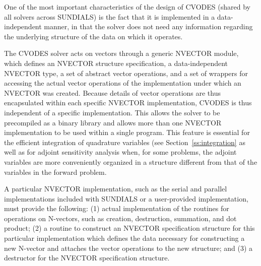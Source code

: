 One of the most important characteristics of the design of CVODES 
(shared by all solvers across SUNDIALS) is the fact that it is implemented 
in a data-independent manner, in that the solver does not need any information
regarding the underlying structure of the data on which it operates.

The CVODES solver acts on vectors through a generic NVECTOR module,
which defines an NVECTOR structure specification, a data-independent NVECTOR type, 
a set of abstract vector operations, and a set of wrappers for accessing the actual vector
operations of the implementation under which an NVECTOR was created. Because
details of vector operations are thus encapsulated within each specific
NVECTOR implementation, CVODES is thus independent of a specific
implementation. This allows the solver to be precompiled as a binary
library and allows more than one NVECTOR implementation to be used within
a single program. This feature is essential for the efficient integration of
quadrature variables (see Section~\ref{ss:integration} as well as for
adjoint sensitivity analysis when, for some problems, the adjoint variables
are more conveniently organized in a structure different from that of
the variables in the forward problem.

A particular NVECTOR implementation, such as the serial and parallel 
implementations included with SUNDIALS or a user-provided implementation,
must provide the following:
(1) actual implementation of the routines for operations on N-vectors, 
such as creation, destruction, summation, and dot product;
(2) a routine to construct an NVECTOR specification structure
for this particular implementation which defines the data necessary
for constructing a new N-vector and attaches the vector operations
to the new structure; and
(3) a destructor for the NVECTOR specification structure.

